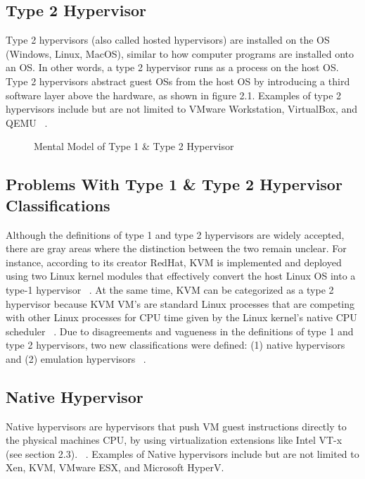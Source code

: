 \documentclass{report}
\begin{document}
\begin{spacing}{1.5}
\subsection{Type 2 Hypervisor}

{\large
Type 2 hypervisors (also called hosted hypervisors) are installed on the OS (Windows, Linux, MacOS), similar to how computer programs are installed onto an OS. In other words, a type 2 hypervisor runs as a process on the host OS. Type 2 hypervisors abstract guest OSs from the host OS by introducing a third software layer above the hardware, as shown in figure 2.1. Examples of type 2 hypervisors include but are not limited to VMware Workstation, VirtualBox, and QEMU ~\cite{bauman2015survey}.
\newline
}


\begin{figure}[ht]
    \caption{Mental Model of Type 1 \& Type 2 Hypervisor}
\end{figure}


\subsection{Problems With Type 1 \& Type 2 Hypervisor Classifications}

{\large
Although the definitions of type 1 and type 2 hypervisors are widely accepted, there are gray areas where the distinction between the two remain unclear. For instance, according to its creator RedHat, KVM is implemented and deployed using two Linux kernel modules that effectively convert the host Linux OS into a type-1 hypervisor ~\cite{graziano2011performance}. At the same time, KVM can be categorized as a type 2 hypervisor because KVM VM's are standard Linux processes that are competing with other Linux processes for CPU time given by the Linux kernel's native CPU scheduler ~\cite{kvmcpuschedule}. Due to disagreements and vagueness in the definitions of type 1 and type 2 hypervisors, two new classifications were defined: (1) native hypervisors and (2) emulation hypervisors ~\cite{10.1145/2775111}.
}



\subsection{Native Hypervisor}

{\large
Native hypervisors are hypervisors that push VM guest instructions directly to the physical machines CPU, by using virtualization extensions like Intel VT-x (see section 2.3). ~\cite{10.1145/2775111}. Examples of Native hypervisors include but are not limited to Xen, KVM, VMware ESX, and Microsoft HyperV.
\newline
}



\end{spacing}
\end{document}
